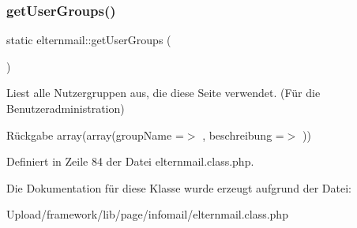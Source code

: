 \subsubsection{\texorpdfstring{get\+User\+Groups()}{getUserGroups()}}
{\footnotesize\ttfamily static elternmail\+::get\+User\+Groups (\begin{DoxyParamCaption}{ }\end{DoxyParamCaption})\hspace{0.3cm}{\ttfamily [static]}}

Liest alle Nutzergruppen aus, die diese Seite verwendet. (Für die Benutzeradministration) \begin{DoxyReturn}{Rückgabe}
array(array(\textquotesingle{}group\+Name\textquotesingle{} =$>$ \textquotesingle{}\textquotesingle{}, \textquotesingle{}beschreibung\textquotesingle{} =$>$ \textquotesingle{}\textquotesingle{})) 
\end{DoxyReturn}


Definiert in Zeile 84 der Datei elternmail.\+class.\+php.



Die Dokumentation für diese Klasse wurde erzeugt aufgrund der Datei\+:\begin{DoxyCompactItemize}
\item 
Upload/framework/lib/page/infomail/elternmail.\+class.\+php\end{DoxyCompactItemize}
